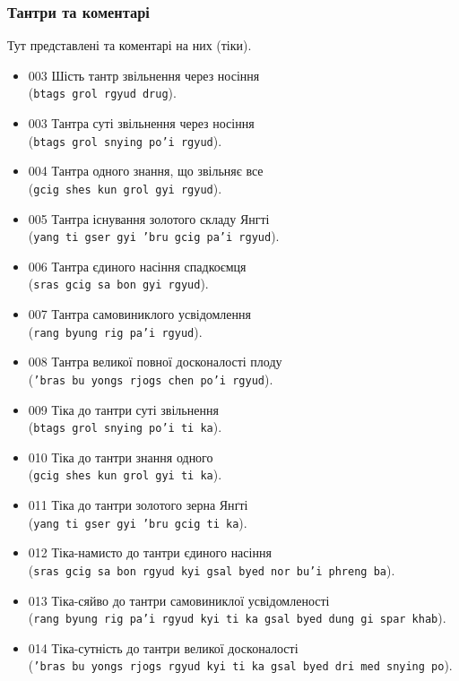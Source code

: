 \documentclass{article}
\begin{document}
\subsubsection{Тантри та коментарі}

Тут представлені та коментарі на них (тіки).

\begingroup\raggedright
\begin{itemize}
\item 003 Шість тантр звільнення через носіння \\ (\texttt{btags grol rgyud drug}).
\item 003 Тантра суті звільнення через носіння \\ (\texttt{btags grol snying po'i rgyud}).
\item 004 Тантра одного знання, що звільняє все \\ (\texttt{gcig shes kun grol gyi rgyud}).
\item 005 Тантра існування золотого складу Янгті \\ (\texttt{yang ti gser gyi 'bru gcig pa'i rgyud}).
\item 006 Тантра єдиного насіння спадкоємця \\ (\texttt{sras gcig sa bon gyi rgyud}).
\item 007 Тантра самовиниклого усвідомлення \\  (\texttt{rang byung rig pa'i rgyud}).
\item 008 Тантра великої повної досконалості плоду \\ (\texttt{'bras bu yongs rjogs chen po'i rgyud}).
\item 009 Тіка до тантри суті звільнення \\ (\texttt{btags grol snying po'i ti ka}).
\item 010 Тіка до тантри знання одного \\ (\texttt{gcig shes kun grol gyi ti ka}).
\item 011 Тіка до тантри золотого зерна Янґті \\ (\texttt{yang ti gser gyi 'bru gcig ti ka}).
\item 012 Тіка-намисто до тантри єдиного насіння \\ (\texttt{sras gcig sa bon rgyud kyi gsal byed nor bu'i phreng ba}).
\item 013 Тіка-сяйво до тантри самовиниклої усвідомленості \\ (\texttt{rang byung rig pa'i rgyud kyi ti ka gsal byed dung gi spar khab}).
\item 014 Тіка-сутність до тантри великої досконалості \\ (\texttt{'bras bu yongs rjogs rgyud kyi ti ka gsal byed dri med snying po}).

\end{itemize}
\end{document}
